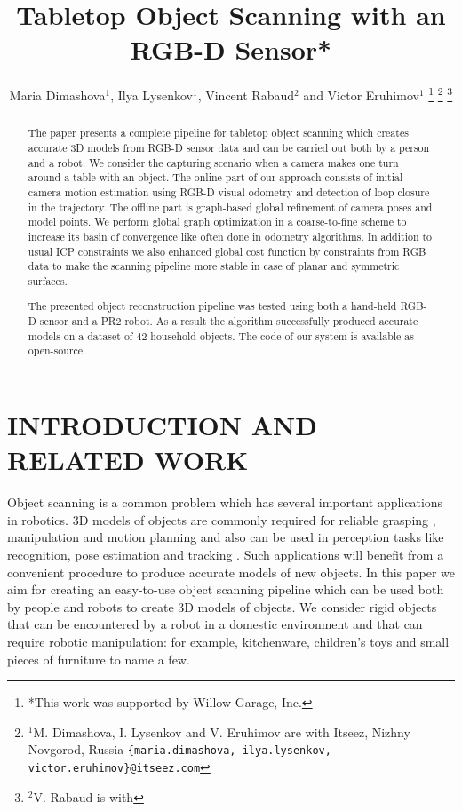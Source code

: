 \documentclass[letterpaper, 10 pt, conference]{ieeeconf}  %
\title{\LARGE \bf
Tabletop Object Scanning with an RGB-D Sensor*
}
\author{Maria Dimashova$^{1}$, Ilya Lysenkov$^{1}$, Vincent Rabaud$^{2}$ and Victor Eruhimov$^{1}$
\thanks{*This work was supported by Willow Garage, Inc.}%
\thanks{$^{1}$M. Dimashova, I. Lysenkov and V. Eruhimov are with Itseez, Nizhny Novgorod, Russia
        {\tt\small \{maria.dimashova, ilya.lysenkov, victor.eruhimov\}@itseez.com}}%
\thanks{$^{2}$V. Rabaud is with {\tt\small }}%
}
\begin{document}
\maketitle
\thispagestyle{empty}
\pagestyle{empty}


\begin{abstract}
The paper presents a complete pipeline for tabletop object scanning
which creates accurate 3D models from RGB-D sensor data and can be carried out both by a person
and a robot. We consider the capturing scenario when a camera makes
one turn around a table with an object. The online part of our approach consists 
of initial camera motion estimation using RGB-D visual
odometry and detection of loop closure in the trajectory. The offline part
is graph-based global refinement of camera poses and model points.
We perform global graph optimization in a coarse-to-fine scheme to 
increase its basin of convergence like often done in odometry algorithms. 
In addition to usual ICP constraints we also enhanced global cost function 
by constraints from RGB data to make the scanning pipeline more stable in case 
of planar and symmetric surfaces. 

The presented object reconstruction pipeline was tested using both a hand-held RGB-D sensor and a PR2 robot.
As a result the algorithm successfully produced accurate models on a dataset of 42 household objects.
The code of our system is available as open-source.

\end{abstract}


\section{INTRODUCTION AND RELATED WORK}

Object scanning is a common problem which has several important applications in robotics.
3D models of objects are commonly required for reliable grasping \cite{miller2004graspit, sahbani2012overview},
manipulation and motion planning and also can be used in perception tasks like recognition, pose estimation and tracking \cite{klank2009real, hinterstoisser2012accv}.
Such applications will benefit from a convenient procedure
to produce accurate models of new objects.
In this paper we aim for creating an easy-to-use object scanning pipeline
which can be used both by people and robots to create 3D models of objects.
We consider rigid objects that can be encountered
by a robot in a domestic environment and that can require robotic manipulation:
for example, kitchenware, children's toys and small pieces of furniture to name a few.
\end{document}
